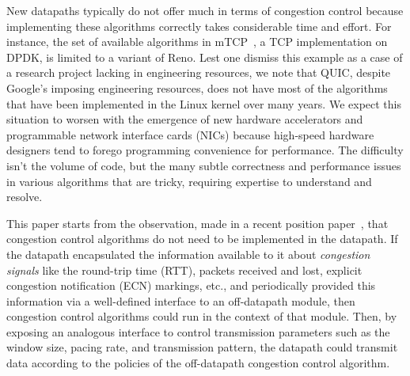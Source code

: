 New datapaths typically do not offer much in terms of congestion control because implementing these algorithms correctly takes considerable time and effort. For instance, the set of available algorithms in mTCP~\cite{mtcp}, a TCP implementation on DPDK, is limited to a variant of Reno. Lest one dismiss this example as a case of a research project lacking in engineering resources, we note that QUIC, despite Google's imposing engineering resources, does not have most of the algorithms that have been implemented in the Linux kernel over many years.  We expect this situation to worsen with the emergence of new hardware accelerators and programmable network interface cards (NICs) because high-speed hardware designers tend to forego programming convenience for performance. The difficulty isn't the volume of code, but the many subtle correctness and performance issues in various algorithms that are tricky, requiring expertise to understand and resolve.

This paper starts from the observation, made in a recent position paper~\cite{ccp-hotnets}, that congestion control algorithms do not need to be implemented in the datapath. If the datapath encapsulated the information available to it about {\em congestion signals} like the round-trip time (RTT), packets received and lost, explicit congestion notification (ECN) markings, etc., and periodically provided this information via a well-defined interface to an off-datapath module, then congestion control algorithms could run in the context of that module. Then, by exposing an analogous interface to control transmission parameters such as the window size, pacing rate, and transmission pattern, the datapath could transmit data according to the policies of the off-datapath congestion control algorithm. 


